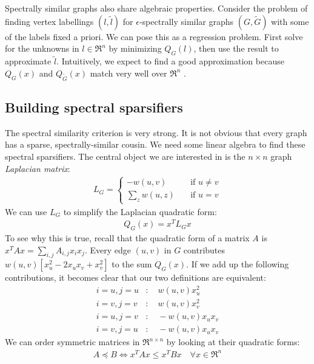 \documentclass{article}
\begin{document}
Spectrally similar graphs also share algebraic properties. Consider the
problem of finding vertex labellings $(l, \tilde{l})$ for
$\epsilon$-spectrally similar graphs $(G, \tilde{G})$ with some of the
labels fixed a priori. We can pose this as a regression problem. First solve
for the unknowns in $l \in \Re^n$ by minimizing $Q_G(l)$, then use the
result to approximate $\tilde{l}$. Intuitively, we expect to find a good
approximation because $Q_G(x)$ and $Q_{\tilde{G}}(x)$ match very well over
$\Re^n$ \cite{TheSurvey}.

\subsection{Building spectral sparsifiers}

The spectral similarity criterion is very strong. It is not obvious that
every graph has a sparse, spectrally-similar cousin. We need some linear
algebra to find these spectral sparsifiers. The central object we are
interested in is the $n \times n$ graph \textit{Laplacian matrix}:
\begin{align*}
    L_G =
    \begin{cases}
        -w(u, v) \quad &\text{if } u \not= v \\
        \sum_{z} w(u, z) \quad &\text{if } u = v
    \end{cases}
\end{align*}
We can use $L_G$ to simplify the Laplacian quadratic form:
\begin{align*}
    Q_G(x) = x^TL_Gx
\end{align*}
To see why this is true, recall that the quadratic form of a matrix $A$ is
$x^TAx = \sum_{i,j} A_{i,j}x_ix_j$.  Every edge $(u, v)$ in $G$ contributes
$w(u, v)[x_u^2 - 2x_ux_v + x_v^2]$ to the sum $Q_G(x)$. If we add up the
following contributions, it becomes clear that our two definitions are
equivalent:
\begin{align*}
    i = u, j = u &:\quad w(u, v)x_u^2 \\
    i = v, j = v &:\quad w(u, v)x_v^2 \\
    i = u, j = v &:\quad -w(u, v)x_ux_v \\
    i = v, j = u &:\quad -w(u, v)x_ux_v
\end{align*}
We can order symmetric matrices in $\Re^{n \times n}$ by looking at their
quadratic forms:
\begin{align*}
    A \preceq B \Leftrightarrow x^TAx \leq x^TBx \quad \forall{x \in \Re^n}
\end{align*}
\end{document}
